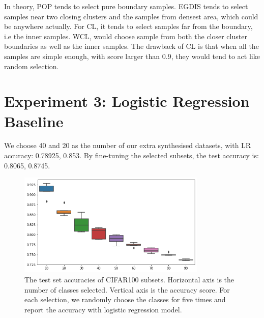 In theory, POP tends to select pure boundary samples. EGDIS tends to select samples near two closing clusters and the samples from densest area, which could be anywhere actually. For CL, it tends to select samples far from the boundary, i.e the inner samples. WCL, would choose sample from both the closer cluster boundaries as well as the inner samples. The drawback of CL is that when all the samples are simple enough, with score larger than 0.9, they would tend to act like random selection.



\section{Experiment 3: Logistic Regression Baseline}
We choose 40 and 20 as the number of our extra synthesised datasets, with LR accuracy: 0.78925, 0.853. By fine-tuning the selected subsets, the test accuracy is: 0.8065, 0.8745.

 \begin{figure}[H]
 \centering
 \includegraphics[width=0.8\textwidth]{src/subsets.png}
 \caption{The test set accuracies of CIFAR100 subsets. Horizontal axis is the number of classes selected. Vertical axis is the accuracy score. For each selection, we randomly choose the classes for five times and report the accuracy with logistic regression model.}
 \label{Fig.logistic_subsets}
 \end{figure}
 
